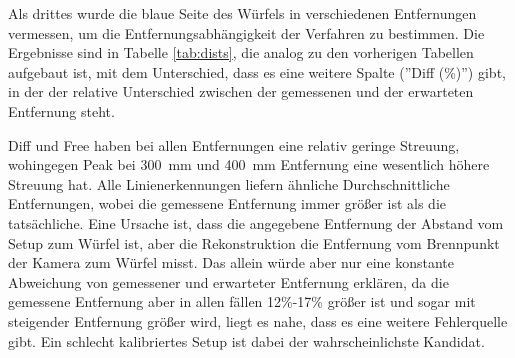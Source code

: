 \documentclass[ngerman,a4paper,parskip=half]{scrartcl}
\begin{document}
Als drittes wurde die blaue Seite des Würfels in verschiedenen Entfernungen vermessen, um die Entfernungsabhängigkeit der Verfahren zu bestimmen. Die Ergebnisse sind in Tabelle \ref{tab:dists}, die analog zu den vorherigen Tabellen aufgebaut ist, mit dem Unterschied, dass es eine weitere Spalte (''Diff (\%)'') gibt, in der der relative Unterschied zwischen der gemessenen und der erwarteten Entfernung steht.

Diff und Free haben bei allen Entfernungen eine relativ geringe Streuung, wohingegen Peak bei 300~mm und 400~mm Entfernung eine wesentlich höhere Streuung hat. Alle Linienerkennungen liefern ähnliche Durchschnittliche Entfernungen, wobei die gemessene Entfernung immer größer ist als die tatsächliche. Eine Ursache ist, dass die angegebene Entfernung der Abstand vom Setup zum Würfel ist, aber die Rekonstruktion die Entfernung vom Brennpunkt der Kamera zum Würfel misst. Das allein würde aber nur eine konstante Abweichung von gemessener und erwarteter Entfernung erklären, da die gemessene Entfernung aber in allen fällen 12\%-17\% größer ist und sogar mit steigender Entfernung größer wird, liegt es nahe, dass es eine weitere Fehlerquelle gibt. Ein schlecht kalibriertes Setup ist dabei der wahrscheinlichste Kandidat.
\end{document}
